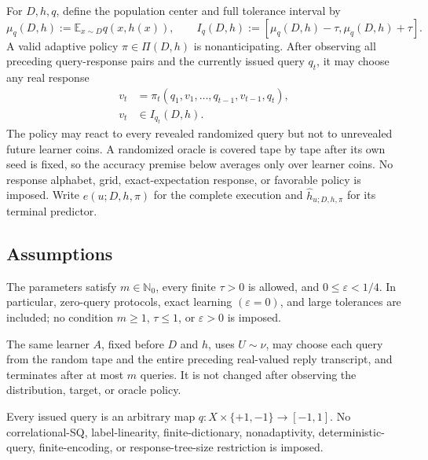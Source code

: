 For $D,h,q$, define the population center and full tolerance interval by
\[
\mu_q(D,h):=\mathbb E_{x\sim D}q(x,h(x)),\qquad
I_q(D,h):=[\mu_q(D,h)-\tau,\mu_q(D,h)+\tau].
\]
A valid adaptive policy $\pi\in\Pi(D,h)$ is nonanticipating.  After observing
all preceding query-response pairs and the currently issued query $q_t$, it
may choose any real response
\[
\begin{aligned}
v_t&=\pi_t(q_1,v_1,\ldots,q_{t-1},v_{t-1},q_t),\\
v_t&\in I_{q_t}(D,h).
\end{aligned}
\]
The policy may react to every revealed randomized query but not to unrevealed
future learner coins.  A randomized oracle is covered tape by tape after its
own seed is fixed, so the accuracy premise below averages only over learner
coins.  No response alphabet, grid, exact-expectation response, or favorable
policy is imposed.  Write $e(u;D,h,\pi)$ for the complete execution and
$\widehat h_{u;D,h,\pi}$ for its terminal predictor.

\subsection{Assumptions}

\begin{assumption}
\label{assump:source-parameter-regime}
The parameters satisfy $m\in\mathbb N_0$, every finite $\tau>0$ is allowed,
and $0\le\varepsilon<1/4$.  In particular, zero-query protocols, exact
learning $(\varepsilon=0)$, and large tolerances are included; no condition
$m\ge1$, $\tau\le1$, or $\varepsilon>0$ is imposed.
\end{assumption}

\begin{assumption}
\label{assump:finite-horizon-randomized-adaptivity}
The same learner $A$, fixed before $D$ and $h$, uses $U\sim\nu$, may choose
each query from the random tape and the entire preceding real-valued reply
transcript, and terminates after at most $m$ queries.  It is not changed after
observing the distribution, target, or oracle policy.
\end{assumption}

\begin{assumption}
\label{assump:bounded-unrestricted-queries}
Every issued query is an arbitrary map
$q:X\times\{+1,-1\}\to[-1,1]$.  No correlational-SQ, label-linearity,
finite-dictionary, nonadaptivity, deterministic-query, finite-encoding, or
response-tree-size restriction is imposed.
\end{assumption}

